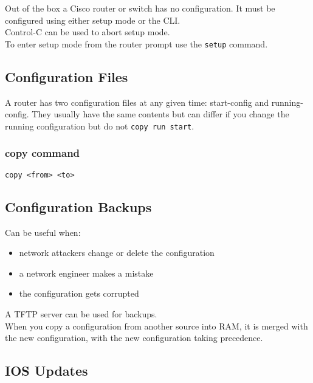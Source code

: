 Out of the box a Cisco router or switch has no configuration. It must
be configured using either setup mode or the CLI.\\

Control-C can be used to abort setup mode.\\

To enter setup mode from the router prompt use the \texttt{setup} command.\\

\subsection{Configuration Files}

A router has two configuration files at any given time: start-config and
running-config. They usually have the same contents but can differ if you
change the running configuration but do not \texttt{copy run start}.\\

\subsubsection{copy command}

\texttt{copy <from> <to>}

\subsection{Configuration Backups}

Can be useful when:

\begin{itemize}

\item network attackers change or delete the configuration
\item a network engineer makes a mistake
\item the configuration gets corrupted

\end{itemize}

A TFTP server can be used for backups.\\

When you copy a configuration from another source into RAM, it is merged with
the new configuration, with the new configuration taking precedence.

\subsection{IOS Updates}

